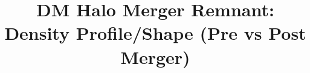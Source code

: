 \documentclass{aastex62}
\begin{document}
\title{DM Halo Merger Remnant:  Density Profile/Shape (Pre vs Post Merger)}%


\end{document}
